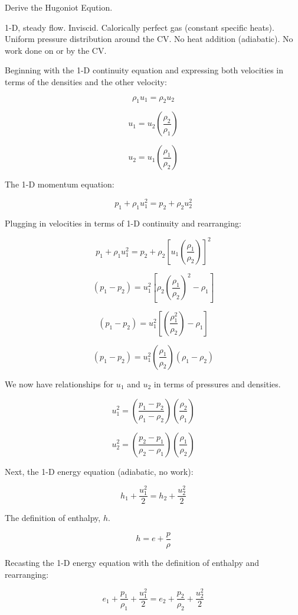 \documentclass[../main.tex]{subfiles}
\begin{document}

Derive the Hugoniot Eqution.

\assumptions{}
1-D, steady flow.
Inviscid.
Calorically perfect gas (constant specific heats).
Uniform pressure distribution around the CV.
No heat addition (adiabatic).
No work done on or by the CV.

\solution{}

Beginning with the 1-D continuity equation and expressing both velocities in terms of the densities and the other velocity:

\[
    \rho_1 u_1 = \rho_2 u_2
\]

\[
    u_1 = u_2 \left({\frac{\rho_2}{\rho_1}}\right)
\]

\[
    u_2 = u_1 \left({\frac{\rho_1}{\rho_2}}\right)
\]

The 1-D momentum equation:

\[
    p_1 + \rho_1 u_1^2 = p_2 + \rho_2 u_2^2    
\]

Plugging in velocities in terms of 1-D continuity and rearranging:

\[
    p_1 + \rho_1 u_1^2 = p_2 + \rho_2 \left[{u_1 \left({\frac{\rho_1}{\rho_2}}\right)}\right]^2
\]

\[
    (p_1-p_2) =  u_1^2 \left[{\rho_2 \left({\frac{\rho_1}{\rho_2}}\right)^2 - \rho_1}\right]
\]

\[
    (p_1-p_2) = u_1^2 \left[{\left({\frac{\rho_1^2}{\rho_2}}\right) - \rho_1}\right]
\]

\[
    (p_1-p_2) = u_1^2 \left({\frac{\rho_1}{\rho_2}}\right) \left({\rho_1-\rho_2}\right)
\]

We now have relationships for \(u_1\) and \(u_2\) in terms of pressures and densities.

\[
    u_1^2 = \left({\frac{p_1-p_2}{\rho_1-\rho_2}}\right) \left({\frac{\rho_2}{\rho_1}}\right)
\]

\[
    u_2^2 = \left({\frac{p_2-p_1}{\rho_2-\rho_1}}\right) \left({\frac{\rho_1}{\rho_2}}\right)
\]

Next, the 1-D energy equation (adiabatic, no work):

\[
    h_1 + \frac{u_1^2}{2} = h_2 + \frac{u_2^2}{2} 
\]    

The definition of enthalpy, \(h\).

\[
    h = e + \frac{p}{\rho}    
\]

Recasting the 1-D energy equation with the definition of enthalpy and rearranging:

\[
    e_1 + \frac{p_1}{\rho_1} + \frac{u_1^2}{2} = e_2 + \frac{p_2}{\rho_2} + \frac{u_2^2}{2} 
\] 
\end{document}
